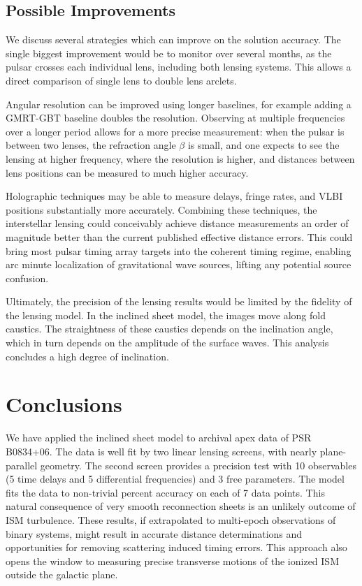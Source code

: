 \documentclass[useAMS,usenatbib]{mn2e}
\begin{document}
\subsection{Possible Improvements}

We discuss several strategies which can improve on the solution
accuracy.  The single biggest improvement would be to monitor over
several months, as the pulsar crosses each individual lens,
including both lensing systems.  This allows a direct comparison of
single lens to double lens arclets.

Angular resolution can be improved using longer baselines, for example
adding a GMRT-GBT baseline doubles the resolution.  Observing at
multiple frequencies over a longer period allows for a more precise
measurement: when the pulsar is between two lenses, the refraction
angle $\beta$ is small, and one expects to see the lensing at higher
frequency, where the resolution is higher, and distances between
lens positions can be measured to much higher accuracy.

Holographic techniques \citep{2008MNRAS.388.1214W,2014MNRAS.440L..36P}
may be able to measure delays, fringe rates, and VLBI positions
substantially more accurately.  Combining these techniques, the
interstellar lensing could conceivably achieve distance measurements
an order of magnitude better than the current published effective
distance errors.  This could bring most pulsar timing array targets
into the coherent timing regime, enabling arc minute localization of
gravitational wave sources, lifting any potential source confusion.

Ultimately, the precision of the lensing results would be limited by
the fidelity of the lensing model.  In the inclined sheet model, the
images move along fold caustics.  The straightness of these caustics
depends on the inclination angle, which in turn depends on the
amplitude of the surface waves.  This analysis concludes a high degree
of inclination.

\section{Conclusions}

We have applied the \citep{2014MNRAS.442.3338P} inclined sheet model
to archival apex data of PSR B0834+06.  The data is well fit by two
linear lensing screens, with nearly plane-parallel geometry.  The
second screen provides a precision test with 10 observables (5 time delays and 5 differential frequencies) and 3 free
parameters.  The model fits the data to non-trivial percent accuracy
on each of 7 data points.  This natural consequence of very smooth
reconnection sheets is an unlikely outcome of ISM turbulence.  These
results, if extrapolated to multi-epoch observations of binary
systems, might result in accurate distance determinations and
opportunities for removing scattering induced timing errors.  This
approach also opens the window to measuring precise transverse motions
of the ionized ISM outside the galactic plane.
\end{document}

